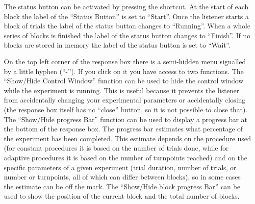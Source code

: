 \documentclass[a4paper,12pt,english]{sphinxmanual}
\begin{document}
The status button can be activated by pressing the  shortcut.
At the start of each block the label of the “Status Button” is set to
“Start”. Once the listener starts a block of trials the label of the
status button changes to “Running”. When a whole series of blocks is
finished the label of the status button changes to “Finish”. If no
blocks are stored in memory the label of the status button is set to
“Wait”.

On the top left corner of the response box there is a semi-hidden menu
signalled by a little hyphen (“-”). If you click on it you have access
to two functions. The “Show/Hide Control Window” function can be used to
hide the control window while the experiment is running. This is useful
because it prevents the listener from accidentally changing your
experimental parameters or accidentally closing  (the
response box itself has no “close” button, so it is not possible to
close that). The “Show/Hide progress Bar” function can be used to
display a progress bar at the bottom of the response box. The progress
bar estimates what percentage of the experiment has been completed. This
estimate depends on the procedure used (for constant procedures it is
based on the number of trials done, while for adaptive procedures it is
based on the number of turnpoints reached) and on the specific
parameters of a given experiment (trial duration, number of trials, or
number or turnpoints, all of which can differ between blocks), so in
some cases the estimate can be off the mark. The “Show/Hide block
progress Bar” can be used to show the position of the current block and
the total number of blocks.
\end{document}
